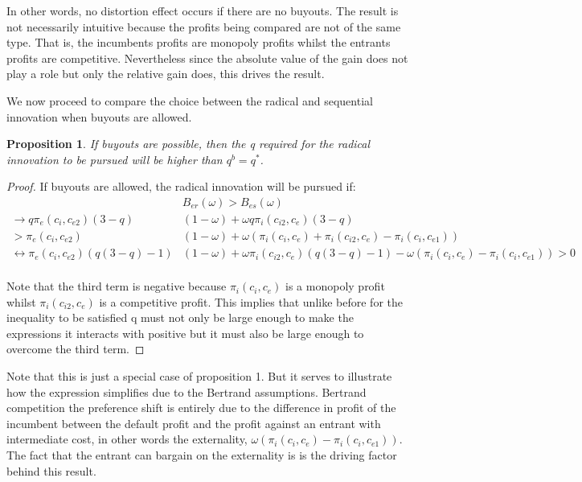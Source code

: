 \documentclass[11pt]{article}
\newtheorem{proposition}{Proposition}
\begin{document}
In other words, no distortion effect occurs if there are no buyouts. The result is not necessarily intuitive because the profits being compared are not of the same type. That is, the incumbents profits are monopoly profits whilst the entrants profits are competitive. Nevertheless since the absolute value of the gain does not play a role but only the relative gain does, this drives the result. 

We now proceed to compare the choice between the radical and sequential innovation when buyouts are allowed.

\begin{proposition}
\label{higherq}
If buyouts are possible, then the q required for the radical innovation to be pursued will be higher than $q^b=q^*$. 
\end{proposition}

\begin{proof}
If buyouts are allowed, the radical innovation will be pursued if:
\begin{align*}
&B_{er}(\omega)>B_{es}(\omega) \\
\rightarrow q \pi_{e}(c_{i},c_{e2})(3-q)&(1-\omega)
+ \omega q 
\pi_{i}(c_{i2},c_{e}) (3-q) \\
> \pi_{e}(c_{i},c_{e2})&(1-\omega)+ \omega (\pi_{i}(c_{i},c_{e}) +  \pi_{i}(c_{i2},c_{e}) - \pi_{i}(c_{i},c_{e1}) ) \\
\leftrightarrow \pi_{e}(c_{i},c_{e2})(q(3-q)-1)&(1-\omega)
+ \omega \pi_{i}(c_{i2},c_{e}) (q(3-q)-1)-\omega(\pi_{i}(c_{i},c_{e})- \pi_{i}(c_{i},c_{e1})) 
> 0 \\
\end{align*}

Note that the third term is negative because $\pi_{i}(c_{i},c_{e})$ is a monopoly profit whilst  $\pi_{i}(c_{i2},c_{e})$ is a competitive profit. This implies that unlike before for the inequality to be satisfied q must not only be large enough to make the expressions it interacts with positive but it must also be large enough to overcome the third term.
\end{proof}

Note that this is just a special case of proposition 1. But it serves to illustrate how the expression simplifies due to the Bertrand assumptions. Bertrand competition the preference shift is entirely due to the difference in profit of the incumbent between the default profit and the profit against an entrant with intermediate cost, in other words the externality,   $\omega(\pi_i(c_i,c_e)- \pi_i(c_i,c_{e1})) $. The fact that the entrant can bargain on the externality is is the driving factor behind this result. 
\end{document}
